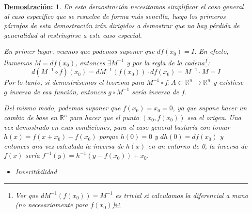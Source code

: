 \documentclass[10pt,a4paper,openright]{book}
\theoremstyle{break}
\newtheorem*{demo}{\underline{Demostración}:}
\begin{document}
\begin{demo}
En esta demostración necesitamos simplificar el caso general al caso específico que se resuelve de forma más sencilla, luego los primeros párrafos de esta demostración irán dirigidos a demostrar que no hay pérdida de generalidad al restringirse a este caso especial.

En primer lugar, veamos que podemos suponer que $df(x_0) = I$. En efecto, llamemos $M = df(x_0)$, entonces $\exists M^{-1}$ y por la regla de la cadena\footnote{Ver que $dM^{-1}\left(f\left(x_0\right)\right) = M^{-1}$ es trivial si calculamos la diferencial a mano (no necesariamente para $f(x_0)$)}:
$$d(M^{-1} \circ f)(x_0) = dM^{-1}\left(f\left(x_0\right)\right) \cdot df(x_0) = M^{-1} \cdot M = I$$
Por lo tanto, si demostrásemos el teorema para $M^{-1} \circ f : A \subset \mathbb{R}^n \to \mathbb{R}^n$ y existiese $g$ inversa de esa función, entonces $g\circ M^{-1}$ sería inversa de $f$.

Del mismo modo, podemos suponer que $f(x_0)=x_0=0$, ya que supone hacer un cambio de base en $\mathbb{R}^n$ para hacer que el punto $(x_0, f(x_0))$ sea el origen. Una vez demostrado en esas condiciones, para el caso general bastaría con tomar $h(x) = f(x + x_0) - f(x_0)$ porque $h(0) = 0$ y $dh(0) = df(x_0)$ y entonces una vez calculada la inversa de $h(x)$ en un entorno de 0, la inversa de $f(x)$ sería $f^{-1}(y) = h^{-1}(y-f(x_0)) + x_0$.

\begin{itemize}
\item Inveritibilidad


\end{itemize}
\end{demo}
\end{document}
